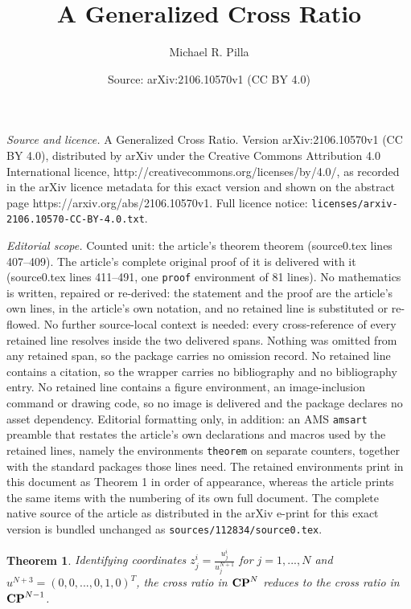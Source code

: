 \documentclass[10pt,a4paper]{amsart}
\title{A Generalized Cross Ratio}
\author{Michael R. Pilla}
\date{Source: arXiv:2106.10570v1 (CC BY 4.0)}
\newtheorem{theorem}{Theorem}
\begin{document}
\maketitle

\noindent\emph{Source and licence.} A Generalized Cross Ratio. Version arXiv:2106.10570v1 (CC BY 4.0), distributed by arXiv under the Creative Commons Attribution 4.0 International licence, http://creativecommons.org/licenses/by/4.0/, as recorded in the arXiv licence metadata for this exact version and shown on the abstract page https://arxiv.org/abs/2106.10570v1. Full licence notice: \texttt{licenses/arxiv-2106.10570-CC-BY-4.0.txt}.\par\smallskip

\noindent\textit{Editorial scope.} Counted unit: the article's theorem theorem (source0.tex lines 407--409). The article's complete original proof of it is delivered with it (source0.tex lines 411--491, one \texttt{proof} environment of 81 lines). No mathematics is written, repaired or re-derived: the statement and the proof are the article's own lines, in the article's own notation, and no retained line is substituted or re-flowed.  No further source-local context is needed: every cross-reference of every retained line resolves inside the two delivered spans.  Nothing was omitted from any retained span, so the package carries no omission record.  No retained line contains a citation, so the wrapper carries no bibliography and no bibliography entry.  No retained line contains a figure environment, an image-inclusion command or drawing code, so no image is delivered and the package declares no asset dependency.  Editorial formatting only, in addition: an AMS \texttt{amsart} preamble that restates the article's own declarations and macros used by the retained lines, namely the environments \texttt{theorem} on separate counters, together with the standard packages those lines need.  The retained environments print in this document as Theorem 1 in order of appearance, whereas the article prints the same items with the numbering of its own full document.  The complete native source of the article as distributed in the arXiv e-print for this exact version is bundled unchanged as \texttt{sources/112834/source0.tex}.
\begin{theorem}
Identifying coordinates $z^i_j=\frac{u^i_j}{u^{N+1}_j}$ for $j=1,...,N$ and $u^{N+3}=(0,0,...,0,1,0)^T$, the cross ratio in ${\bf CP}^N$ reduces to the cross ratio in ${\bf CP}^{N-1}$.
\end{theorem}
\end{document}
